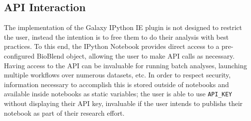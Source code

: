 \documentclass{bioinfo}
\begin{document}
\begin{methods}
\subsection{API Interaction}
The implementation of the Galaxy IPython IE plugin is not designed to restrict the user, instead the intention is to free
them to do their analysis with best practices. To this end, the IPython Notebook provides direct access to a pre-configured
BioBlend object, allowing the user to make API calls as necessary. Having access to the API can be invaluable for running
batch analyses, launching multiple workflows over numerous datasets, etc. In order to respect security, information necessary
to accomplish this is stored outside of notebooks and available inside notebooks as static variables; the user is able to use
\texttt{API\_KEY} without displaying their API key, invaluable if the user intends to publishs their notebook as
part of their research effort.

%
%
%
%
%
%
%
%
%
%



\end{methods}
\end{document}
